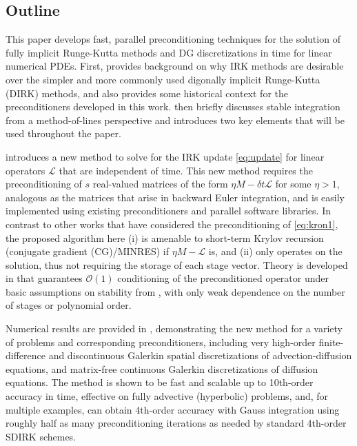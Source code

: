 \documentclass[review]{siamart}
\begin{document}
\subsection{Outline}\label{sec:intro:outline}

This paper develops fast, parallel preconditioning techniques for the solution of fully implicit
Runge-Kutta methods and DG discretizations in time for linear numerical PDEs. First,
 provides background on why IRK methods are desirable over the simpler and more
commonly used digonally implicit Runge-Kutta (DIRK) methods, and also provides some historical
context for the preconditioners developed in this work.  then briefly discusses
stable integration from a method-of-lines perspective and introduces two key elements that will be
used throughout the paper.

 introduces a new method to solve for the IRK update
\eqref{eq:update} for linear operators $\mathcal{L}$ that are independent of time.
This new method requires the preconditioning of $s$ real-valued matrices of the form
$\eta M - \delta t\mathcal{L}$ for some $\eta > 1$, analogous as the matrices that
arise in backward Euler integration, and is easily implemented
using existing preconditioners and parallel software libraries.
In contrast to other works that have considered the preconditioning of \eqref{eq:kron1},
the proposed algorithm here (i) is amenable to short-term Krylov recursion (conjugate
gradient (CG)/MINRES) if $\eta M - \mathcal{L}$ is, and (ii) only operates on the solution,
thus not requiring the storage of each stage vector. Theory is developed in
 that guarantees $\mathcal{O}(1)$ conditioning of the
preconditioned operator under basic assumptions on stability from
, with only weak dependence on the number of
stages or polynomial order.

Numerical results are provided in , demonstrating the new
method for a variety of problems and corresponding preconditioners, including
very high-order finite-difference and discontinuous Galerkin spatial discretizations of
advection-diffusion equations, and matrix-free continuous Galerkin
discretizations of diffusion equations. The method is shown to be fast and scalable
up to 10th-order accuracy in time, effective on fully advective (hyperbolic)
problems, and, for multiple examples, can obtain 4th-order accuracy with Gauss
integration using roughly half as many preconditioning iterations
as needed by standard 4th-order SDIRK schemes.
\end{document}
